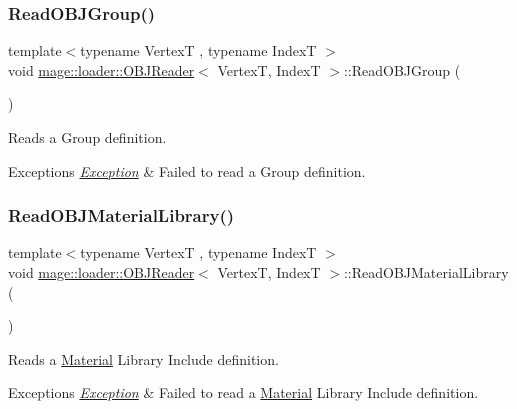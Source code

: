 \subsubsection{\texorpdfstring{Read\+O\+B\+J\+Group()}{ReadOBJGroup()}}
{\footnotesize\ttfamily template$<$typename VertexT , typename IndexT $>$ \\
void \hyperlink{classmage_1_1loader_1_1_o_b_j_reader}{mage\+::loader\+::\+O\+B\+J\+Reader}$<$ VertexT, IndexT $>$\+::Read\+O\+B\+J\+Group (\begin{DoxyParamCaption}{ }\end{DoxyParamCaption})\hspace{0.3cm}{\ttfamily [private]}}

Reads a Group definition.


\begin{DoxyExceptions}{Exceptions}
{\em \hyperlink{classmage_1_1_exception}{Exception}} & Failed to read a Group definition. \\
\hline
\end{DoxyExceptions}
\hypertarget{classmage_1_1loader_1_1_o_b_j_reader_a27f8eb41fe4b8e2e813cda123bfb7b52}{}\label{classmage_1_1loader_1_1_o_b_j_reader_a27f8eb41fe4b8e2e813cda123bfb7b52} 
\subsubsection{\texorpdfstring{Read\+O\+B\+J\+Material\+Library()}{ReadOBJMaterialLibrary()}}
{\footnotesize\ttfamily template$<$typename VertexT , typename IndexT $>$ \\
void \hyperlink{classmage_1_1loader_1_1_o_b_j_reader}{mage\+::loader\+::\+O\+B\+J\+Reader}$<$ VertexT, IndexT $>$\+::Read\+O\+B\+J\+Material\+Library (\begin{DoxyParamCaption}{ }\end{DoxyParamCaption})\hspace{0.3cm}{\ttfamily [private]}}

Reads a \hyperlink{classmage_1_1_material}{Material} Library Include definition.


\begin{DoxyExceptions}{Exceptions}
{\em \hyperlink{classmage_1_1_exception}{Exception}} & Failed to read a \hyperlink{classmage_1_1_material}{Material} Library Include definition. \\
\hline
\end{DoxyExceptions}
\hypertarget{classmage_1_1loader_1_1_o_b_j_reader_ad49aa2f827708f82adacf9e77c368937}{}\label{classmage_1_1loader_1_1_o_b_j_reader_ad49aa2f827708f82adacf9e77c368937} 
